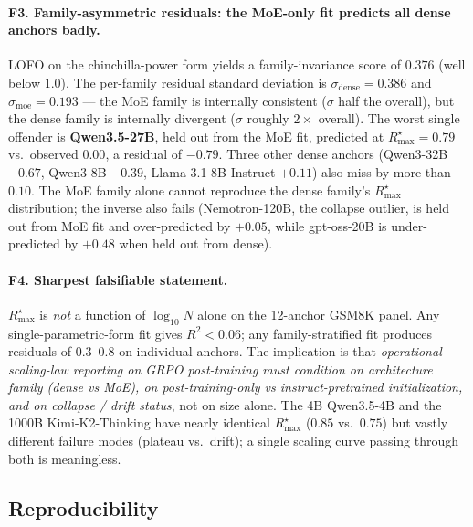 \paragraph{F3. Family-asymmetric residuals: the MoE-only fit predicts all dense anchors badly.}
LOFO on the chinchilla-power form yields a family-invariance score of
$0.376$ (well below 1.0).  The per-family residual standard deviation
is $\sigma_\mathrm{dense} = 0.386$ and $\sigma_\mathrm{moe} = 0.193$
--- the MoE family is internally consistent ($\sigma$ half the
overall), but the dense family is internally divergent ($\sigma$
roughly $2\times$ overall).  The worst single offender is
\textbf{Qwen3.5-27B}, held out from the MoE fit, predicted at
$R_\mathrm{max}^\star = 0.79$ vs.\ observed $0.00$, a residual of
$-0.79$.  Three other dense anchors (Qwen3-32B $-0.67$, Qwen3-8B
$-0.39$, Llama-3.1-8B-Instruct $+0.11$) also miss by more than
$0.10$.  The MoE family alone cannot reproduce the dense family's
$R_\mathrm{max}^\star$ distribution; the inverse also fails
(Nemotron-120B, the collapse outlier, is held out from MoE fit and
over-predicted by $+0.05$, while gpt-oss-20B is under-predicted by
$+0.48$ when held out from dense).

\paragraph{F4. Sharpest falsifiable statement.}
$R_\mathrm{max}^\star$ is \emph{not} a function of $\log_{10} N$
alone on the 12-anchor GSM8K panel.  Any single-parametric-form fit
gives $R^2 < 0.06$; any family-stratified fit produces residuals of
$0.3$--$0.8$ on individual anchors.  The implication is that
\emph{operational scaling-law reporting on GRPO post-training must
condition on architecture family (dense vs MoE), on
post-training-only vs instruct-pretrained initialization, and on
collapse / drift status}, not on size alone.  The 4B Qwen3.5-4B and
the 1000B Kimi-K2-Thinking have nearly identical $R_\mathrm{max}^\star$
($0.85$ vs.\ $0.75$) but vastly different failure modes (plateau vs.\
drift); a single scaling curve passing through both is meaningless.

\subsection*{Reproducibility}

